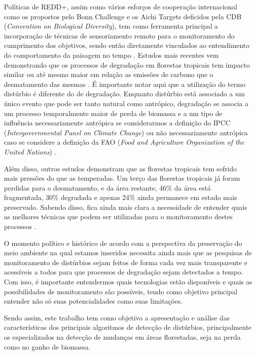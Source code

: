 \documentclass[12pt,a4paper]{article}
\begin{document}
Políticas de REDD+, assim como vários esforços de cooperação internacional como os propostos pelo Bonn Challenge e os Aichi Targets deficidos pela CDB (\textit{Convention on Biological Diversity}), tem como ferramenta principal a incorporação de técnicas de sensoriamento remoto para o monitoramento do cumprimento dos objetivos, sendo então diretamente vinculados ao entendimento do comportamento da paisagem no tempo \citep{BOS2019295, CROUZEILLES2019}. Estudos mais recentes vem demonstrando que os processos de degradação em florestas tropicais tem impacto similar ou até mesmo maior em relação as emissões de carbono que o desmatamento das mesmas \citep{Harris1573, Houghton2012, Grace2014}. É importante notar aqui que a utilização do termo distúrbio é diferente do de degradação. Enquanto distúrbio está associado a um único evento que pode ser tanto natural como antrópico, degradação se associa a um processo temporalmente maior de perda de biomassa e a um tipo de influência necessariamente antrópica se considerarmos a definição do IPCC (\textit{Intergovernmental Panel on Climate Change}) ou não necessariamente antrópica caso se considere a definição da FAO (\textit{Food and Agriculture Organization of the United Nations}) \citep{Hirschmugl2017}. 

Além disso, outros estudos demonstram que as florestas tropicais tem sofrido mais pressões do que as temperadas. Um terço das florestas tropicais já foram perdidas para o desmatamento, e da área restante, 46\% da área está fragmentada, 30\% degradada e apenas 24\% ainda permanece em estado mais preservado. Sabendo disso, fica ainda mais clara a necessidade de entender quais as melhores técnicas que podem ser utilizadas para o monitoramento destes processos \citep{Hirschmugl2017}. 

O momento político e histórico de acordo com a perspectiva da preservação do meio ambiente na qual estamos inseridos necessita ainda mais que as pesquisas de monitoramento de distúrbios sejam feitos de forma cada vez mais transparente e acessíveis a todos para que processos de degradação sejam detectados a tempo. Com isso, é importante entendermos quais tecnologias estão disponíveis e quais as possibilidades de monitoramento são possíveis, tendo como objetivo principal entender não só suas potencialidades como suas limitações. 

Sendo assim, este trabalho tem como objetivo a apresentação e análise das características dos principais algoritmos de detecção de distúrbios, principalmente os especializados na detecção de mudanças em áreas florestadas, seja na perda como no ganho de biomassa.
\end{document}
